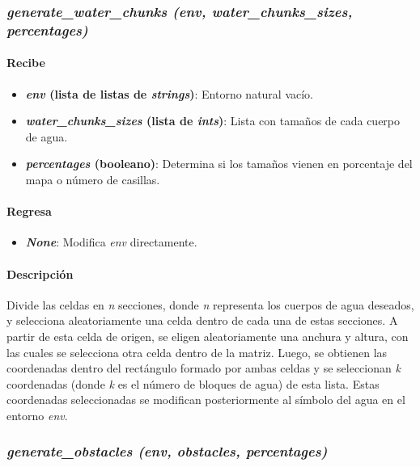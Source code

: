 \documentclass[12pt, letterpaper]{article}
\begin{document}
        \subsubsection{\textit{generate\_water\_chunks (env, water\_chunks\_sizes, percentages)}}
            \paragraph{Recibe}
                \begin{itemize}
                    \item \textbf{\textit{env} (lista de listas de \textit{strings})}: Entorno natural vacío.
                    \item \textbf{\textit{water\_chunks\_sizes} (lista de \textit{ints})}: Lista con tamaños de cada cuerpo de agua.
                    \item \textbf{\textit{percentages} (booleano)}: Determina si los tamaños vienen en porcentaje del mapa o número de casillas.
                \end{itemize}
            \paragraph{Regresa}
                \begin{itemize}
                    \item \textbf{\textit{None}}: Modifica \textit{env} directamente.
                \end{itemize}
            \paragraph{Descripción}
                Divide las celdas en \textit{n} secciones, donde \textit{n} representa los cuerpos de agua deseados, y selecciona aleatoriamente una celda dentro de cada una de estas secciones. A partir de esta celda de origen, se eligen aleatoriamente una anchura y altura, con las cuales se selecciona otra celda dentro de la matriz. Luego, se obtienen las coordenadas dentro del rectángulo formado por ambas celdas y se seleccionan \textit{k} coordenadas (donde \textit{k} es el número de bloques de agua) de esta lista. Estas coordenadas seleccionadas se modifican posteriormente al símbolo del agua en el entorno \textit{env}.
        \subsubsection{\textit{generate\_obstacles (env, obstacles, percentages)}}
\end{document}
